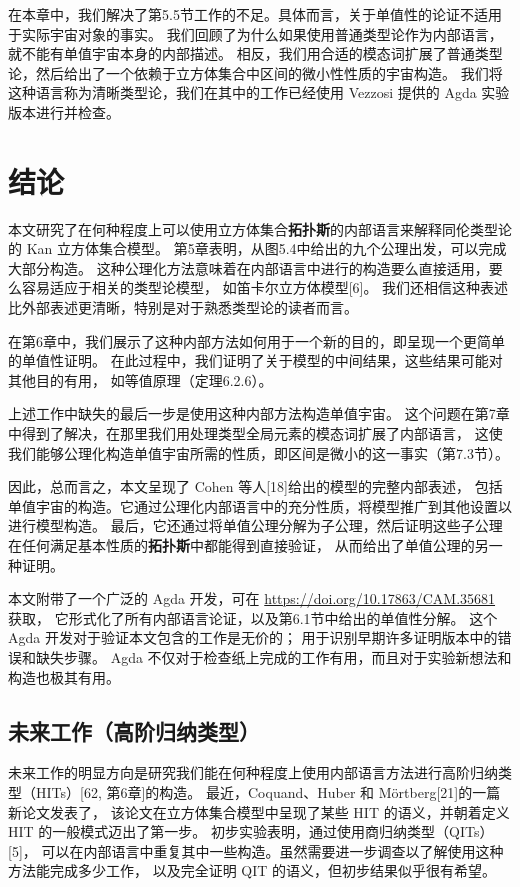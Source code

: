 \documentclass{ctexrep}
\theoremstyle{plain}
\theoremstyle{definition}
\theoremstyle{remark}
\begin{document}
在本章中，我们解决了第5.5节工作的不足。具体而言，关于单值性的论证不适用于实际宇宙对象的事实。
我们回顾了为什么如果使用普通类型论作为内部语言，就不能有单值宇宙本身的内部描述。
相反，我们用合适的模态词扩展了普通类型论，然后给出了一个依赖于立方体集合中区间的微小性性质的宇宙构造。
我们将这种语言称为清晰类型论，我们在其中的工作已经使用 Vezzosi 提供的 Agda 实验版本进行并检查。


\chapter{结论}

本文研究了在何种程度上可以使用立方体集合\textbf{拓扑斯}的内部语言来解释同伦类型论的 Kan 立方体集合模型。
第5章表明，从图5.4中给出的九个公理出发，可以完成大部分构造。
这种公理化方法意味着在内部语言中进行的构造要么直接适用，要么容易适应于相关的类型论模型，
如笛卡尔立方体模型[6]。
我们还相信这种表述比外部表述更清晰，特别是对于熟悉类型论的读者而言。

在第6章中，我们展示了这种内部方法如何用于一个新的目的，即呈现一个更简单的单值性证明。
在此过程中，我们证明了关于模型的中间结果，这些结果可能对其他目的有用，
如等值原理（定理6.2.6）。

上述工作中缺失的最后一步是使用这种内部方法构造单值宇宙。
这个问题在第7章中得到了解决，在那里我们用处理类型全局元素的模态词扩展了内部语言，
这使我们能够公理化构造单值宇宙所需的性质，即区间是微小的这一事实（第7.3节）。

因此，总而言之，本文呈现了 Cohen 等人[18]给出的模型的完整内部表述，
包括单值宇宙的构造。它通过公理化内部语言中的充分性质，将模型推广到其他设置以进行模型构造。
最后，它还通过将单值公理分解为子公理，然后证明这些子公理在任何满足基本性质的\textbf{拓扑斯}中都能得到直接验证，
从而给出了单值公理的另一种证明。

本文附带了一个广泛的 Agda 开发，可在 \url{https://doi.org/10.17863/CAM.35681} 获取，
它形式化了所有内部语言论证，以及第6.1节中给出的单值性分解。
这个 Agda 开发对于验证本文包含的工作是无价的；
用于识别早期许多证明版本中的错误和缺失步骤。
Agda 不仅对于检查纸上完成的工作有用，而且对于实验新想法和构造也极其有用。

\section{未来工作（高阶归纳类型）}

未来工作的明显方向是研究我们能在何种程度上使用内部语言方法进行高阶归纳类型（HITs）[62, 第6章]的构造。
最近，Coquand、Huber 和 Mörtberg[21]的一篇新论文发表了，
该论文在立方体集合模型中呈现了某些 HIT 的语义，并朝着定义 HIT 的一般模式迈出了第一步。
初步实验表明，通过使用商归纳类型（QITs）[5]，
可以在内部语言中重复其中一些构造。虽然需要进一步调查以了解使用这种方法能完成多少工作，
以及完全证明 QIT 的语义，但初步结果似乎很有希望。
\end{document}
